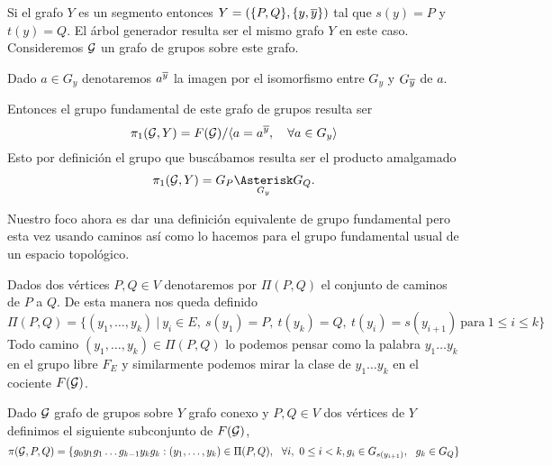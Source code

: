 \documentclass[tesis.tex]{subfiles}
\begin{document}
\begin{ej}\label{ej_pi1_segmento}
	
	Si el grafo $Y$ es un segmento entonces $Y = (\{ P,Q \}, \{ y, \overline y\})$ tal que $s(y) = P$ y $t(y) = Q$.
	El árbol generador resulta ser el mismo grafo $Y$ en este caso.
	Consideremos ${\cal G}$ un grafo de grupos sobre este grafo.
	\begin{center}
	\end{center}
	Dado $a \in G_{y}$ denotaremos $a^{\overline y}$ la imagen por el isomorfismo entre $G_{y}$ y $G_{\overline y}$ de $a$.
	
	Entonces el grupo fundamental de este grafo de grupos resulta ser 
	\[
		\pi_1({\cal G}, Y) =  F({\cal G}) / \langle a = a^{\overline y}, \quad \forall a \in G_{y} \rangle
	\]
	Esto por definición el grupo que buscábamos resulta ser el producto amalgamado
	\[
	\pi_1({\cal G}, Y) = G_P \underset{G_{y}}{\Asterisk} G_Q.
	\]
\end{ej}

Nuestro foco ahora es dar una definición equivalente de grupo fundamental pero esta vez usando caminos así como lo hacemos para el grupo fundamental usual de un espacio topológico.

\medskip
Dados dos vértices $P,Q \in V$ denotaremos por $\Pi(P,Q)$ el conjunto de caminos de $P$ a $Q$.
De esta manera nos queda definido
\[
\Pi(P,Q) = \{  (y_1, \dots, y_k) \ | \ y_{i} \in E, \ s(y_1)=P, \ t(y_k) = Q, \ t(y_i) = s(y_{i+1})  \ \text{para} \ 1 \le i \le k \}
\]
Todo camino $(y_1, \dots, y_k) \in \Pi(P,Q)$ lo podemos pensar como la palabra $y_1 \dots y_k$ en el grupo libre $F_E$ y similarmente podemos mirar la clase de $y_1\dots y_k$ en el cociente $F({\cal G})$.  

\begin{deff}
	Dado ${\cal G}$ grafo de grupos sobre $Y$ grafo conexo y $P,Q \in V$ dos vértices de $Y$ definimos el siguiente subconjunto de $F({\cal G})$,
	\begin{equation*}
		\pi(\cG, P, Q) = \{  g_0y_1g_1 \dots g_{k-1}y_kg_k : (y_1,\dots, y_k) \in \Pi(P,Q), \ \ 
		 \forall i, \ 0 \le i < k, g_i \in G_{s(y_{i+1})}, \ \ g_k \in G_Q \}	
	\end{equation*}
\end{deff}
 
\end{document}
